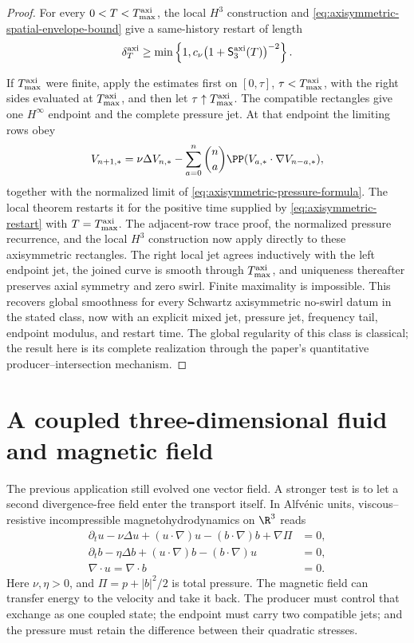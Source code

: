 \begin{proof}
For every \(0<T<T_{\max}^{\rm axi}\), the local \(H^3\) construction and
\eqref{eq:axisymmetric-spatial-envelope-bound} give a same-history restart of
length
\begin{equation}
 \delta_T^{\rm axi}
 \ge\min\left\{1,
 c_\nu\bigl(1+\mathsf S_3^{\rm axi}(T)\bigr)^{-2}
 \right\}.
 \label{eq:axisymmetric-restart}
\end{equation}

If \(T_{\max}^{\rm axi}\) were finite, apply
the estimates first on \([0,\tau]\), \(\tau<T_{\max}^{\rm axi}\), with the
right sides evaluated at \(T_{\max}^{\rm axi}\), and then let
\(\tau\uparrow T_{\max}^{\rm axi}\).  The compatible
rectangles give one \(H^\infty\) endpoint and the complete pressure jet.  At
that endpoint the limiting rows obey
\[
 V_{n+1,*}
 =\nu\Delta V_{n,*}
  -\sum_{a=0}^{n}\binom na
   \PP(V_{a,*}\cdot\nabla V_{n-a,*}),
\]
together with the normalized limit of
\eqref{eq:axisymmetric-pressure-formula}.  The local theorem restarts it for
the positive time supplied by \eqref{eq:axisymmetric-restart} with
\(T=T_{\max}^{\rm axi}\).
The adjacent-row trace proof, the normalized pressure recurrence, and the
local \(H^3\) construction now apply directly to these axisymmetric
rectangles.  The right local jet agrees inductively with the left endpoint
jet, the joined curve is smooth through \(T_{\max}^{\rm axi}\), and uniqueness thereafter
preserves axial symmetry and zero swirl.  Finite maximality is impossible.
This recovers global smoothness for every Schwartz axisymmetric no-swirl datum
in the stated class, now with an explicit mixed jet, pressure jet, frequency
tail, endpoint modulus, and restart time.  The global regularity of this class
is classical; the result here is its complete realization through the paper's
quantitative producer--intersection mechanism.
\end{proof}

\section{A coupled three-dimensional fluid and magnetic field}
\label{sec:mhd-application}

The previous application still evolved one vector field.  A stronger test is
to let a second divergence-free field enter the transport itself.  In
Alfv\'enic units, viscous--resistive incompressible magnetohydrodynamics on
\(\R^3\) reads
\begin{align}
 \partial_tu-\nu\Delta u+(u\cdot\nabla)u-(b\cdot\nabla)b
 +\nabla\Pi&=0,
 \label{eq:mhd-momentum}\\
 \partial_tb-\eta\Delta b+(u\cdot\nabla)b-(b\cdot\nabla)u&=0,
 \label{eq:mhd-induction}\\
 \nabla\cdot u=\nabla\cdot b&=0.
 \label{eq:mhd-divergence}
\end{align}
Here \(\nu,\eta>0\), and
\(\Pi=p+|b|^2/2\) is total pressure.  The magnetic field can transfer
energy to the velocity and take it back.  The producer must control that
exchange as one coupled state; the endpoint must carry two compatible jets;
and the pressure must retain the difference between their quadratic
stresses.

